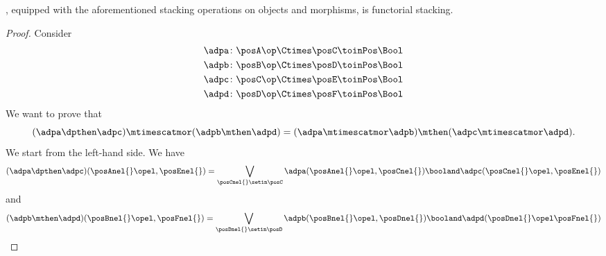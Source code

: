 \begin{lemma}
    \DPL, equipped with the aforementioned stacking operations on objects and morphisms, is functorial stacking.
\end{lemma}

\begin{proof}
    Consider
    \begin{equation}
        \begin{aligned}
            \adpa\colon \posA\op\Ctimes \posC & \toinPos \Bool \\
            \adpb\colon \posB\op\Ctimes \posD & \toinPos \Bool \\
            \adpc\colon \posC\op\Ctimes \posE & \toinPos \Bool \\
            \adpd\colon \posD\op\Ctimes \posF & \toinPos \Bool
        \end{aligned}
    \end{equation}
    We want to prove that
    \begin{equation}
        (\adpa \dpthen \adpc)
        \mtimescatmor (\adpb \mthen \adpd)=(\adpa \mtimescatmor \adpb) \mthen (\adpc \mtimescatmor \adpd).
    \end{equation}
    We start from the left-hand side.
    We have
    \begin{equation}
        (\adpa \dpthen \adpc)(\posAnel{}\opel,\posEnel{})
        =\bigvee_{\posCnel{}\setin \posC}
        \adpa(\posAnel{}\opel, \posCnel{}) \booland \adpc(\posCnel{}\opel,\posEnel{})
    \end{equation}
    and
    \begin{equation}
        \begin{aligned}
            (\adpb \mthen \adpd)(\posBnel{}\opel,\posFnel{})
            =\bigvee_{\posDnel{}\setin \posD}
            \adpb(\posBnel{}\opel, \posDnel{}) \booland \adpd(\posDnel{}\opel\posFnel{})
        \end{aligned}

\end{equation}
\end{proof}

